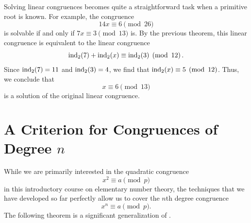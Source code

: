 \begin{example}
  Solving linear congruences becomes quite a straightforward task when a primitive root is known. For example, the congruence
  \begin{equation*}
    14x\equiv 6\pmod{26}
  \end{equation*}
  is solvable if and only if $7x\equiv 3\pmod{13}$ is. By the previous theorem, this linear congruence is equivalent to the linear congruence
  \begin{equation*}
    \operatorname{ind}_2(7)+\operatorname{ind}_2(x)\equiv\operatorname{ind}_2(3)\mkern5mu\left(\operatorname{mod} \mkern 6mu 12\right).
  \end{equation*}
  Since $\operatorname{ind}_2(7)=11$ and $\operatorname{ind}_2(3)=4$, we find that $\operatorname{ind}_2(x)\equiv 5\mkern5mu\left(\operatorname{mod} \mkern 6mu 12\right)$. Thus, we conclude that
  \begin{equation*}
    x\equiv 6\pmod{13}
  \end{equation*}
  is a solution of the original linear congruence.
\end{example}



\section{A Criterion for Congruences of Degree \texorpdfstring{$n$}{n}}

While we are primarily interested in the quadratic congruence
\begin{equation*}
  x^2\equiv a\pmod{p}
\end{equation*}
in this introductory course on elementary number theory, the techniques that we have developed so far perfectly allow us to cover the $n$th degree congruence
\begin{equation*}
  x^n\equiv a\pmod{p}.
\end{equation*}
The following theorem is a significant generalization of .

